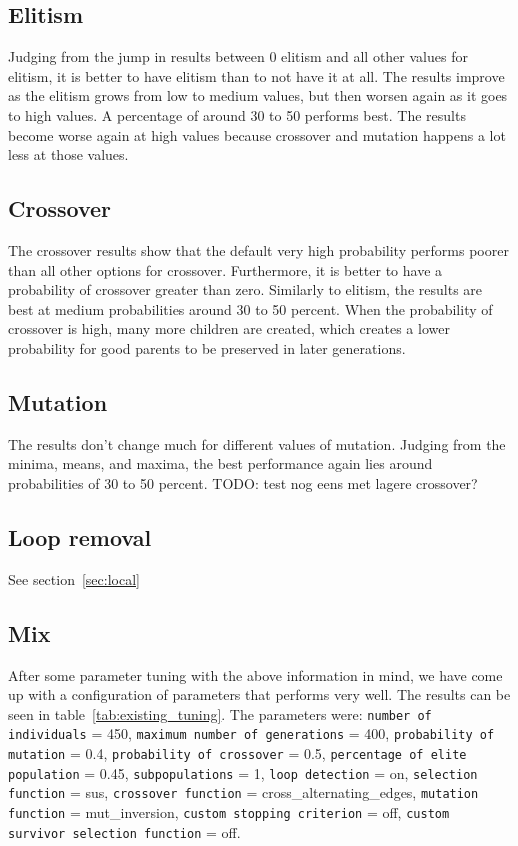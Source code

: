 \documentclass{report}
\begin{document}
\subsection{Elitism}
Judging from the jump in results between 0 elitism and all other values for elitism, it is better to have elitism than to not have it at all. The results improve as the elitism grows from low to medium values, but then worsen again as it goes to high values. A percentage of around 30 to 50 performs best. The results become worse again at high values because crossover and mutation happens a lot less at those values.

\subsection{Crossover}
The crossover results show that the default very high probability performs poorer than all other options for crossover. Furthermore, it is better to have a probability of crossover greater than zero. Similarly to elitism, the results are best at medium probabilities around 30 to 50 percent. When the probability of crossover is high, many more children are created, which creates a lower probability for good parents to be preserved in later generations.

\subsection{Mutation}
The results don't change much for different values of mutation. Judging from the minima, means, and maxima, the best performance again lies around probabilities of 30 to 50 percent.
TODO: test nog eens met lagere crossover?

\subsection{Loop removal}
See section~\ref{sec:local}

\subsection{Mix}
After some parameter tuning with the above information in mind, we have come up with a configuration of parameters that performs very well. The results can be seen in table~\ref{tab:existing_tuning}. The parameters were: \texttt{number of individuals} = 450, \texttt{maximum number of generations} = 400, \texttt{probability of mutation} = 0.4, \texttt{probability of crossover} = 0.5, \texttt{percentage of elite population} = 0.45, \texttt{subpopulations} = 1, \texttt{loop detection} = on, \texttt{selection function} = sus, \texttt{crossover function} = cross\_alternating\_edges, \texttt{mutation function} = mut\_inversion, \texttt{custom stopping criterion} = off, \texttt{custom survivor selection function} = off.

\end{document}

